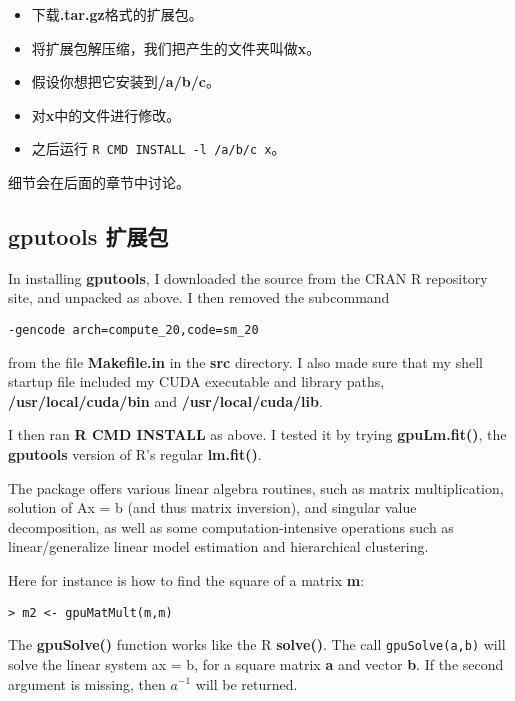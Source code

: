 \begin{itemize}

\item 下载{\bf .tar.gz}格式的扩展包。

\item 将扩展包解压缩，我们把产生的文件夹叫做{\bf x}。

\item 假设你想把它安装到{\bf /a/b/c}。

\item 对{\bf x}中的文件进行修改。

\item 之后运行 \texttt{R CMD INSTALL -l /a/b/c x}。

\end{itemize}

细节会在后面的章节中讨论。

\subsection{gputools 扩展包}

In installing {\bf gputools}, I downloaded the source from the CRAN R
repository site, and unpacked as above.  I then removed the subcommand

\begin{verbatim}
-gencode arch=compute_20,code=sm_20
\end{verbatim}

from the file {\bf Makefile.in} in the {\bf src} directory.  I also
made sure that my shell startup file included my CUDA executable and
library paths, {\bf /usr/local/cuda/bin} and {\bf /usr/local/cuda/lib}.

I then ran {\bf R CMD INSTALL} as above.  I tested it by trying
{\bf gpuLm.fit()}, the {\bf gputools} version of R's regular {\bf
lm.fit()}.

The package offers various linear algebra routines, such as matrix
multiplication, solution of Ax = b (and thus matrix inversion), and
singular value decomposition, as well as some computation-intensive
operations such as linear/generalize linear model estimation and
hierarchical clustering.

Here for instance is how to find the square of a matrix {\bf m}:

\begin{lstlisting}
> m2 <- gpuMatMult(m,m)
\end{lstlisting}

The {\bf gpuSolve()} function works like the R {\bf solve()}.  The call
\lstinline{gpuSolve(a,b)} will solve the linear system ax = b, for a
square matrix {\bf a} and vector {\bf b}.  If the second argument is
missing, then $a^{-1}$ will be returned.

